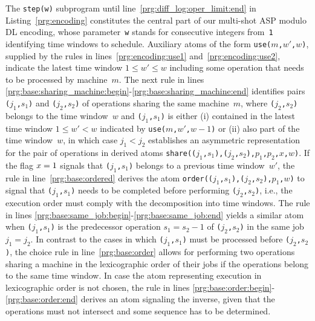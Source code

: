 \documentclass{tlp} %
\begin{document}
The \lstinline{step(w)} subprogram until line~\ref{prg:diff_log:oper_limit:end} 
in Listing~\ref{prg:encoding} constitutes the central part of our multi-shot ASP modulo DL encoding, whose parameter~\lstinline{w} stands for consecutive integers from~\lstinline{1}
identifying time windows to schedule.
Auxiliary atoms of the form \lstinline{use(}$m$\lstinline{,}$w'$\lstinline{,}$w$\lstinline{)},
supplied by the rules in lines~\ref{prg:encoding:use1} and~\ref{prg:encoding:use2},
indicate the latest time window $1\leq w'\leq w$ including some operation that needs
to be processed by machine~$m$.
The next rule in lines \ref{prg:base:sharing_machine:begin}-\ref{prg:base:sharing_machine:end}
identifies pairs \lstinline{(}$j_1$\lstinline{,}$s_1$\lstinline{)} and
\lstinline{(}$j_2$\lstinline{,}$s_2$\lstinline{)} of operations sharing
the same machine~$m$,
where
\lstinline{(}$j_2$\lstinline{,}$s_2$\lstinline{)} belongs to the time window~$w$ and
\lstinline{(}$j_1$\lstinline{,}$s_1$\lstinline{)} is either 
(i)
contained in the latest time window $1\leq w'< w$ indicated by
\lstinline{use(}$m$\lstinline{,}$w'$\lstinline{,}$w-1$\lstinline{)} or
(ii)
also part of the time window~$w$, in which case $j_1 < j_2$ establishes
an asymmetric representation for the pair of operations in derived atoms
\lstinline{share((}$j_1$\lstinline{,}$s_1$\lstinline{),(}$j_2$\lstinline{,}$s_2$\lstinline{),}$p_1$\lstinline{,}$p_2$\lstinline{,}$x$\lstinline{,}$w$\lstinline{)}.
If the flag $x=\text{\lstinline{1}}$ signals that 
\lstinline{(}$j_1$\lstinline{,}$s_1$\lstinline{)}
belongs to a previous time window~$w'$,
the rule in line~\ref{prg:base:ordered} %
derives the atom
\lstinline{order((}$j_1$\lstinline{,}$s_1$\lstinline{),(}$j_2$\lstinline{,}$s_2$\lstinline{),}$p_1$\lstinline{,}$w$\lstinline{)}
to signal that \lstinline{(}$j_1$\lstinline{,}$s_1$\lstinline{)} needs to be completed
before performing \lstinline{(}$j_2$\lstinline{,}$s_2$\lstinline{)}, i.e.,
the execution order must comply with the decomposition into time windows.
The rule in lines \ref{prg:base:same_job:begin}-\ref{prg:base:same_job:end} yields
a similar atom when \lstinline{(}$j_1$\lstinline{,}$s_1$\lstinline{)}
is the predecessor operation $s_1 = s_2-1$ of \lstinline{(}$j_2$\lstinline{,}$s_2$\lstinline{)}
in the same job $j_1=j_2$.
In contrast to the cases in which 
\lstinline{(}$j_1$\lstinline{,}$s_1$\lstinline{)} must be processed before
\lstinline{(}$j_2$\lstinline{,}$s_2$\lstinline{)},
the choice rule in line~\ref{prg:base:order}
allows for performing two operations sharing a machine in the lexicographic order
of their jobs if the operations belong to the same time window.
In case the atom representing execution in lexicographic order is not chosen,
the rule in lines \ref{prg:base:order:begin}-\ref{prg:base:order:end}
derives an atom signaling the inverse, given that the operations must not intersect and some sequence has to be determined.%
%

\end{document}
